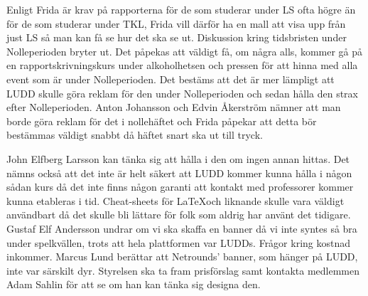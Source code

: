 \documentclass{protokoll}
\begin{document}
Enligt Frida är krav på rapporterna för de som studerar under LS ofta högre än för de som studerar under TKL, Frida vill därför ha en mall att visa upp från just LS så man kan få se hur det ska se ut.  
Diskussion kring tidsbristen under Nolleperioden bryter ut. Det påpekas att väldigt få, om några alls, kommer gå på en rapportskrivningskurs under alkoholhetsen och pressen för att hinna med alla event som är under Nolleperioden. Det bestäms att det är mer lämpligt att LUDD skulle göra reklam för den under Nolleperioden och sedan hålla den strax efter Nolleperioden. Anton Johansson och Edvin Åkerström nämner att man borde göra reklam för det i nollehäftet och Frida påpekar att detta bör bestämmas väldigt snabbt då häftet snart ska ut till tryck.  

John Elfberg Larsson kan tänka sig att hålla i den om ingen annan hittas. 
Det nämns också att det inte är helt säkert att LUDD kommer kunna hålla i någon sådan kurs då det inte finns någon garanti att kontakt med professorer kommer kunna etableras i tid. 
Cheat-sheets för \LaTeX och liknande skulle vara väldigt användbart då det skulle bli lättare för folk som aldrig har använt det tidigare.  
Gustaf Elf Andersson undrar om vi ska skaffa en banner då vi inte syntes så bra under spelkvällen, trots att hela plattformen var LUDDs. Frågor kring kostnad inkommer. 
Marcus Lund berättar att Netrounds' banner, som hänger på LUDD, inte var särskilt dyr. 
Styrelsen ska ta fram prisförslag samt kontakta medlemmen Adam Sahlin för att se om han kan tänka sig designa den.
\end{document}
